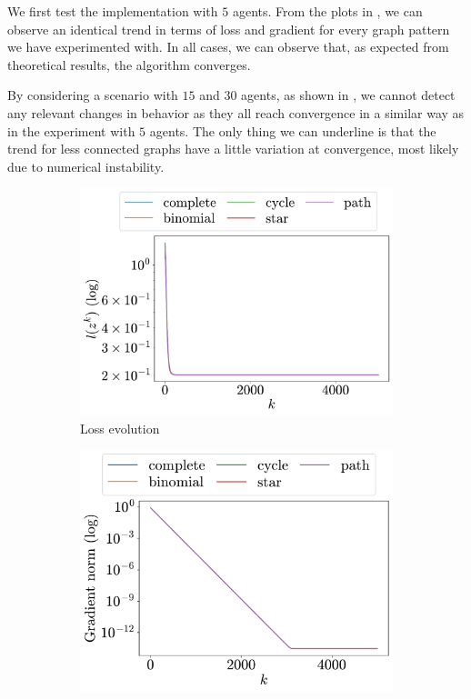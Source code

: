 \documentclass[a4paper,11pt,oneside]{book}
\begin{document}
We first test the implementation with $5$ agents. From the plots in , we can observe an identical trend in terms of loss and gradient for every graph pattern we have experimented with. In all cases, we can observe that, as expected from theoretical results, the algorithm converges.

By considering a scenario with $15$ and $30$ agents, as shown in , we cannot detect any relevant changes in behavior as they all reach convergence in a similar way as in the experiment with $5$ agents. The only thing we can underline is that the trend for less connected graphs have a little variation at convergence, most likely due to numerical instability.

\begin{figure}[H]
      \centering
      \begin{subfigure}[t]{0.48\linewidth}
            \centering
            \includegraphics[width=\linewidth]{./figs/aggregative/few_agents/loss.pdf} 
            \caption{Loss evolution}
      \end{subfigure}
      \hfill
      \begin{subfigure}[t]{0.48\linewidth}
            \centering
            \includegraphics[width=\linewidth]{./figs/aggregative/few_agents/gradient.pdf} 

\end{subfigure}
\end{figure}
\end{document}
